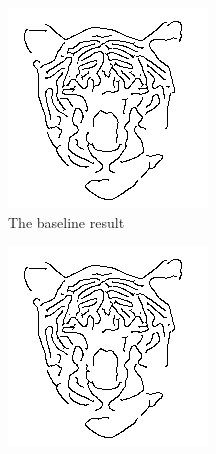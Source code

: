 \begin{figure}
    \centering
    \begin{subfigure}[b]{0.3\textwidth}
                \includegraphics[width=\textwidth]{images/tiger_baseline}
                \caption{The baseline result}
                \label{fig:tiger_baseline}
        \end{subfigure}
        \begin{subfigure}[b]{0.3\textwidth}
                \includegraphics[width=\textwidth]{images/tiger_out}

\end{subfigure}
\end{figure}
